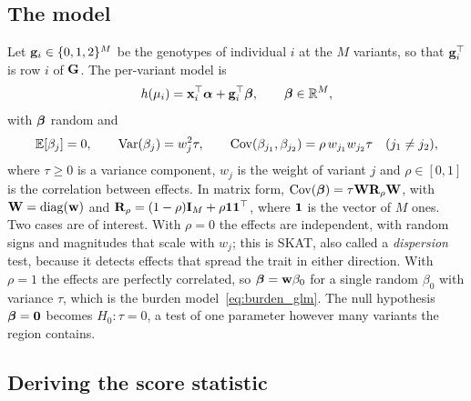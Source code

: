 \subsection{The model}

Let $\mathbf{g}_i\in\{0,1,2\}^M$ be the genotypes of individual $i$ at the $M$ variants, so that $\mathbf{g}_i^\top$ is row $i$ of $\mathbf{G}$. The per-variant model is
\begin{equation}
  h(\mu_i) = \mathbf{x}_i^\top\boldsymbol{\alpha} + \mathbf{g}_i^\top\boldsymbol{\beta}, \qquad \boldsymbol{\beta}\in\mathbb{R}^M,
\end{equation}
with $\boldsymbol{\beta}$ random and
\begin{equation}
  \mathbb{E}[\beta_j]=0, \qquad \operatorname{Var}(\beta_j)=w_j^2\tau, \qquad \operatorname{Cov}(\beta_{j_1},\beta_{j_2})=\rho\,w_{j_1}w_{j_2}\tau \quad (j_1\neq j_2),
  \label{eq:skat_prior}
\end{equation}
where $\tau\geq 0$ is a variance component, $w_j$ is the weight of variant $j$ and $\rho\in[0,1]$ is the correlation between effects. In matrix form, $\operatorname{Cov}(\boldsymbol{\beta})=\tau\mathbf{W}\mathbf{R}_\rho\mathbf{W}$, with $\mathbf{W}=\operatorname{diag}(\mathbf{w})$ and $\mathbf{R}_\rho=(1-\rho)\mathbf{I}_M+\rho\mathbf{1}\mathbf{1}^\top$, where $\mathbf{1}$ is the vector of $M$ ones. Two cases are of interest. With $\rho=0$ the effects are independent, with random signs and magnitudes that scale with $w_j$; this is SKAT, also called a \emph{dispersion} test, because it detects effects that spread the trait in either direction. With $\rho=1$ the effects are perfectly correlated, so $\boldsymbol{\beta}=\mathbf{w}\beta_0$ for a single random $\beta_0$ with variance $\tau$, which is the burden model~\eqref{eq:burden_glm}. The null hypothesis $\boldsymbol{\beta}=\mathbf{0}$ becomes $H_0:\tau=0$, a test of one parameter however many variants the region contains.

\subsection{Deriving the score statistic}

